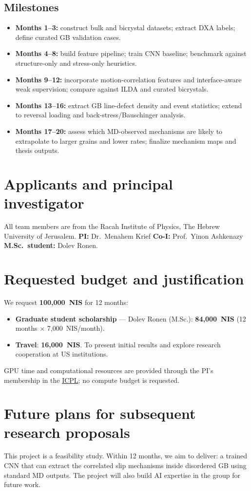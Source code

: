 \documentclass[11pt]{article}
\begin{document}
\subsection*{Milestones}
\begin{itemize}
    \item \textbf{Months 1--3:} construct bulk and bicrystal datasets; extract DXA labels; define curated GB validation cases.
    \item \textbf{Months 4--8:} build feature pipeline; train CNN baseline; benchmark against structure-only and stress-only heuristics.
    \item \textbf{Months 9--12:} incorporate motion-correlation features and interface-aware weak supervision; compare against ILDA and curated bicrystals.
    \item \textbf{Months 13--16:} extract GB line-defect density and event statistics; extend to reversal loading and back-stress/Bauschinger analysis.
    \item \textbf{Months 17--20:} assess which MD-observed mechanisms are likely to extrapolate to larger grains and lower rates; finalize mechanism maps and thesis outputs.
\end{itemize}

\section*{Applicants and principal investigator}

All team members are from the Racah Institute of Physics, The Hebrew University of Jerusalem.
\textbf{PI:} Dr.\ Menahem Krief
\textbf{Co-I:} Prof.\ Yinon Ashkenazy
\textbf{M.Sc.\ student:} Dolev Ronen.

\section*{Requested budget and justification}

We request \textbf{100,000~NIS} for 12 months:
\begin{itemize}
    \item \textbf{Graduate student scholarship} --- Dolev Ronen (M.Sc.): \textbf{84,000~NIS} (12 months $\times$ 7,000~NIS/month).
    \item \textbf{Travel}: \textbf{16,000~NIS}. To present initial results and explore research cooperation at US institutions.
\end{itemize}
GPU time and computational resources are provided through the PI's membership in the \href{http://icpl.huji.ac.il}{ICPL}; no compute budget is requested.

\section*{Future plans for subsequent research proposals}

This project is a feasibility study.
Within 12 months, we aim to deliver: a trained CNN that can extract the correlated slip mechanisms inside disordered GB using standard MD outputs.
The project will also build AI expertise in the group for future work.


{\footnotesize


}
\end{document}
